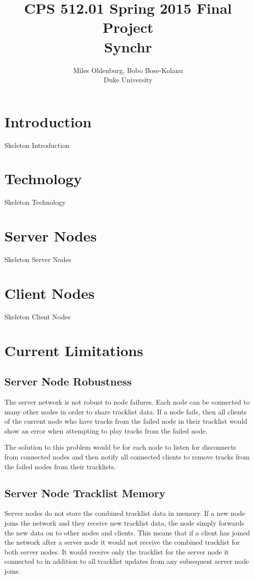 \documentclass[12pt]{article}
\title{CPS 512.01 Spring 2015 Final Project \\ Synchr}
\author{Miles Oldenburg, Bobo Bose-Kolanu \\ Duke University}
\begin{document}
\maketitle

\newpage

\tableofcontents

\newpage

\section{Introduction}

Skeleton Introduction

\section{Technology}

Skeleton Technology

\section{Server Nodes}

Skeleton Server Nodes

\section{Client Nodes}

Skeleton Client Nodes

\section{Current Limitations}

\subsection{Server Node Robustness}
The server network is not robust to node failures. Each node can be connected to many other nodes in order to share tracklist data. If a node fails, then all clients of the current node who have tracks from the failed node in their tracklist would show an error when attempting to play tracks from the failed node.

The solution to this problem would be for each node to listen for disconnects from connected nodes and then notify all connected clients to remove tracks from the failed nodes from their tracklists.

\subsection{Server Node Tracklist Memory}
Server nodes do not store the combined tracklist data in memory. If a new node joins the network and they receive new tracklist data, the node simply forwards the new data on to other nodes and clients. This means that if a client has joined the network after a server node it would not receive the combined tracklist for both server nodes. It would receive only the tracklist for the server node it connected to in addition to all tracklist updates from any subsequent server node joins.
\end{document}

